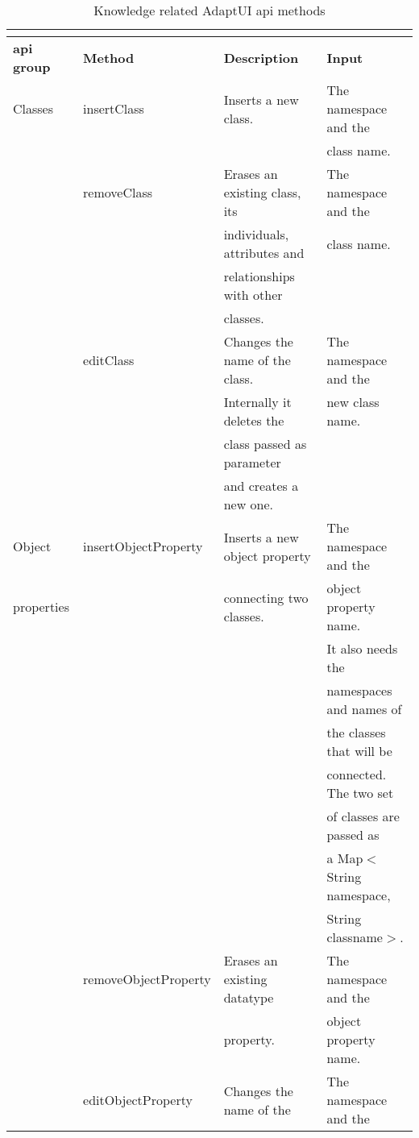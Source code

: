 \begin{center}
\footnotesize

\begin{longtable}{l l l l}
  \caption{Knowledge related AdaptUI \ac{api} methods}\\
  \label{tbl:api_knowledge} \\
  \hline 
  \textbf{\ac{api} group}& \textbf{Method}& \textbf{Description} 	& \textbf{Input}\\
  \hline
  Classes	& insertClass		& Inserts a new class.		& The namespace and the \\
		& 			& 				& class name.		\\
		& removeClass		& Erases an existing class, its	& The namespace and the \\
		& 			& individuals, attributes and	& class name.		\\
		& 			& relationships with other 	& 			\\
		& 			& classes.			& 			\\
		& editClass		& Changes the name of the class.& The namespace and the \\
		&			& Internally it deletes the 	& new class name.	\\
		&			& class passed as parameter 	&			\\
		&			& and creates a new one.	&			\\
\hline 
  Object 	& insertObjectProperty	& Inserts a new object property	& The namespace and the	\\
  properties	&			& connecting two classes.	&  object property name.\\
		&			&				& It also needs the 	\\
		& 			& 				& namespaces and names of\\
		&			&				& the classes that will be\\
		& 			& 				& connected. The two set\\ 
		&			&				& of classes are passed as\\
		& 			& 				& a Map$<$String namespace,\\
		& 			& 				& String classname$>$.	\\
		& removeObjectProperty	& Erases an existing datatype	& The namespace and the \\
		& 			& property.			& object property name.	\\
		& editObjectProperty	& Changes the name of the 	& The namespace and the \\

\end{longtable}
\end{center}
